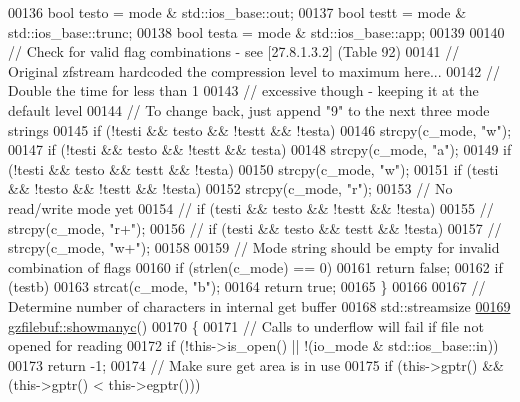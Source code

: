 \begin{DoxyCode}
00136   \textcolor{keywordtype}{bool} testo = mode & std::ios\_base::out;
00137   \textcolor{keywordtype}{bool} testt = mode & std::ios\_base::trunc;
00138   \textcolor{keywordtype}{bool} testa = mode & std::ios\_base::app;
00139 
00140   \textcolor{comment}{// Check for valid flag combinations - see [27.8.1.3.2] (Table 92)}
00141   \textcolor{comment}{// Original zfstream hardcoded the compression level to maximum here...}
00142   \textcolor{comment}{// Double the time for less than 1%
00143   \textcolor{comment}{// excessive though - keeping it at the default level}
00144   \textcolor{comment}{// To change back, just append "9" to the next three mode strings}
00145   \textcolor{keywordflow}{if} (!testi && testo && !testt && !testa)
00146     strcpy(c\_mode, \textcolor{stringliteral}{"w"});
00147   \textcolor{keywordflow}{if} (!testi && testo && !testt && testa)
00148     strcpy(c\_mode, \textcolor{stringliteral}{"a"});
00149   \textcolor{keywordflow}{if} (!testi && testo && testt && !testa)
00150     strcpy(c\_mode, \textcolor{stringliteral}{"w"});
00151   \textcolor{keywordflow}{if} (testi && !testo && !testt && !testa)
00152     strcpy(c\_mode, \textcolor{stringliteral}{"r"});
00153   \textcolor{comment}{// No read/write mode yet}
00154 \textcolor{comment}{//  if (testi && testo && !testt && !testa)}
00155 \textcolor{comment}{//    strcpy(c\_mode, "r+");}
00156 \textcolor{comment}{//  if (testi && testo && testt && !testa)}
00157 \textcolor{comment}{//    strcpy(c\_mode, "w+");}
00158 
00159   \textcolor{comment}{// Mode string should be empty for invalid combination of flags}
00160   \textcolor{keywordflow}{if} (strlen(c\_mode) == 0)
00161     \textcolor{keywordflow}{return} \textcolor{keyword}{false};
00162   \textcolor{keywordflow}{if} (testb)
00163     strcat(c\_mode, \textcolor{stringliteral}{"b"});
00164   \textcolor{keywordflow}{return} \textcolor{keyword}{true};
00165 \}
00166 
00167 \textcolor{comment}{// Determine number of characters in internal get buffer}
00168 std::streamsize
\hyperlink{classgzfilebuf_afbe2418d8a9c3f4a321cc26aa4ae5f7a}{00169} \hyperlink{classgzfilebuf_afbe2418d8a9c3f4a321cc26aa4ae5f7a}{gzfilebuf::showmanyc}()
00170 \{
00171   \textcolor{comment}{// Calls to underflow will fail if file not opened for reading}
00172   \textcolor{keywordflow}{if} (!this->is\_open() || !(io\_mode & std::ios\_base::in))
00173     \textcolor{keywordflow}{return} -1;
00174   \textcolor{comment}{// Make sure get area is in use}
00175   \textcolor{keywordflow}{if} (this->gptr() && (this->gptr() < this->egptr()))
}
\end{DoxyCode}
